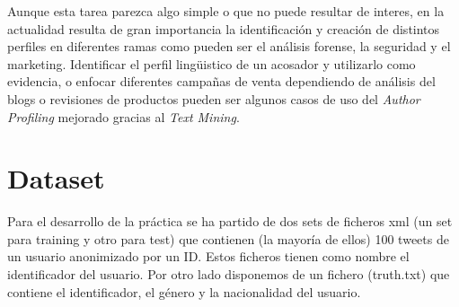 \documentclass[11pt,a4paper]{article}
\begin{document}
Aunque esta tarea parezca algo simple o que no puede resultar de interes, en la actualidad resulta de gran importancia la identificación y creación de distintos perfiles en diferentes ramas como pueden ser el análisis forense, la seguridad y el marketing. Identificar el perfil lingüistico de un acosador y utilizarlo como evidencia, o enfocar diferentes campañas de venta dependiendo de análisis del blogs o revisiones de productos pueden ser algunos casos de uso del \textit{Author Profiling} mejorado gracias al \textit{Text Mining}.

\section{Dataset}

Para el desarrollo de la práctica se ha partido de dos sets de ficheros xml (un set para training y otro para test) que contienen (la mayoría de ellos) 100 tweets de un usuario anonimizado por un ID. Estos ficheros tienen como nombre el identificador del usuario. Por otro lado disponemos de un fichero (truth.txt) que contiene el identificador, el género y la nacionalidad del usuario. 
\end{document}
